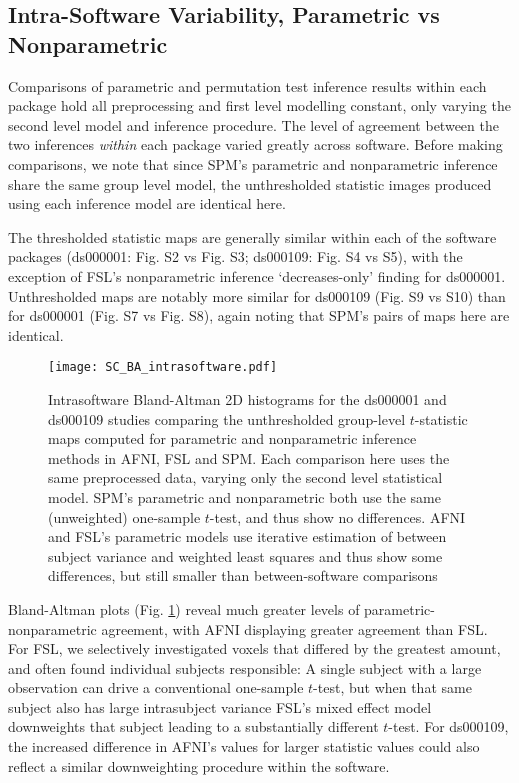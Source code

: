 \subsection{Intra-Software Variability, Parametric vs Nonparametric}

Comparisons of parametric and permutation test inference results within each package hold all preprocessing and first level modelling constant, only varying the second level model and inference procedure. The level of agreement between the two inferences \textit{within} each package varied greatly across software. Before making comparisons, we note that since SPM's parametric and nonparametric inference share the same group level model, the unthresholded statistic images produced using each inference model are identical here.

The thresholded statistic maps are generally similar within each of the software packages (ds000001: Fig. S2 vs Fig. S3; ds000109: Fig. S4 vs S5), with the exception of FSL's nonparametric inference `decreases-only' finding for ds000001. Unthresholded maps are notably more similar for ds000109 (Fig. S9 vs S10) than for ds000001 (Fig. S7 vs Fig. S8), again noting that SPM's pairs of maps here are identical. 

\begin{figure}[htbp]
\centering
	\texttt{[image: SC\_BA\_intrasoftware.pdf]}	
\caption{Intrasoftware Bland-Altman 2D histograms for the ds000001 and ds000109 studies comparing the unthresholded group-level $t$-statistic maps computed for parametric and nonparametric inference methods in AFNI, FSL and SPM. Each comparison here uses the same preprocessed data, varying only the second level statistical model. SPM's parametric and nonparametric both use the same (unweighted) one-sample $t$-test, and thus show no differences. AFNI and FSL's parametric models use iterative estimation of between subject variance and weighted least squares and thus show some differences, but still smaller than between-software comparisons}
\label{fig:BA_intrasoftware}
\end{figure}

Bland-Altman plots (Fig. \ref{fig:BA_intrasoftware}) reveal much greater levels of parametric-nonparametric agreement, with AFNI displaying greater agreement than FSL. For FSL, we selectively investigated voxels that differed by the greatest amount, and often found individual subjects responsible: A single subject with a large observation can drive a conventional one-sample $t$-test, but when that same subject also has large intrasubject variance FSL's mixed effect model downweights that subject leading to a substantially different $t$-test. For ds000109, the increased difference in AFNI's values for larger statistic values could also reflect a similar downweighting procedure within the software.

